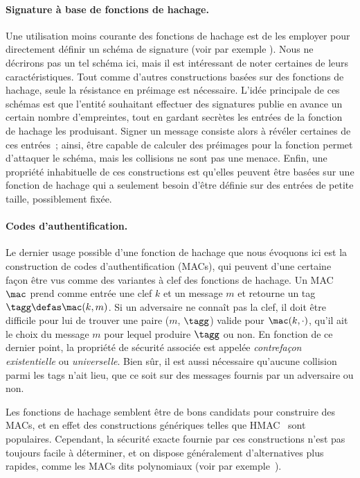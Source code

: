 \paragraph{Signature à base de fonctions de hachage.}
Une utilisation moins courante des fonctions de hachage est de les employer pour directement définir un schéma de signature
(voir par exemple \cite{DBLP:conf/crypto/Merkle87}). Nous ne décrirons pas un tel schéma ici, mais il est intéressant de noter certaines
de leurs caractéristiques.
Tout comme d'autres constructions basées sur des fonctions de hachage, seule la résistance en préimage est nécessaire.
L'idée principale de ces schémas est que l'entité souhaitant  effectuer des signatures publie en avance un certain nombre d'empreintes, tout en gardant
secrètes les entrées de la fonction de hachage les produisant. Signer un message consiste alors à révéler certaines de ces entrées~; ainsi, être capable
de calculer des préimages pour la fonction permet d'attaquer le schéma, mais les collisions ne sont pas une menace.
Enfin, une propriété inhabituelle de ces constructions est qu'elles peuvent être basées sur une fonction de hachage qui a seulement besoin
d'être définie sur des entrées de petite taille, possiblement fixée.

\paragraph{Codes d'authentification.}
Le dernier usage possible d'une fonction de hachage que nous évoquons ici est la construction de codes d'authentification (MACs),
qui peuvent d'une certaine façon être vus comme des variantes à clef des fonctions de hachage.
Un MAC $\mac$ prend comme entrée une clef $k$ et un message $m$ et retourne un tag
$\tagg \defas \mac(k, m)$.
Si un adversaire ne connaît pas la clef, il doit être difficile pour lui de trouver une paire ($m$, $\tagg$) valide pour
$\mac(k, \cdot)$, qu'il ait le choix du message $m$ pour lequel produire $\tagg$ ou non.
En fonction de ce dernier point, la propriété de sécurité associée est appelée \emph{contrefaçon existentielle} ou \emph{universelle}.
Bien sûr, il est aussi nécessaire qu'aucune collision parmi les tags n'ait lieu, que ce soit sur des messages fournis par un adversaire ou non.

Les fonctions de hachage semblent être de bons candidats pour construire des MACs, et en effet des constructions génériques telles que 
HMAC~\cite{DBLP:conf/crypto/BellareCK96} sont populaires. Cependant, la sécurité exacte fournie par ces constructions n'est pas toujours facile à déterminer,
et on dispose généralement d'alternatives plus rapides, comme les MACs dits polynomiaux
(voir par exemple~\cite{DBLP:conf/crypto/BlackHKKR99}).

